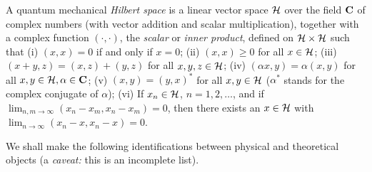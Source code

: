 \documentclass [11pt]{llncs}
\begin{document}
A quantum mechanical {\em Hilbert space} is a linear
vector space ${\cal H}$ over the field ${\bf C}$ of complex numbers
(with vector addition
and scalar multiplication), together  with a complex function
$(\cdot ,\cdot
)$, the {\em scalar} or {\em inner product}, defined on ${\cal
H}\times{\cal H}$ such that
(i)
$(x,x)=0$ if and only if $x=0$;
(ii)
$(x,x)\ge 0$ for all $x \in{\cal H}$;
(iii)
$(x+y,z)=(x,z)+(y,z)$ for all $x,y,z \in {\cal H}$;
(iv)
$(\alpha x,y)=\alpha (x,y)$ for all $x,y \in {\cal H}, \alpha \in {\bf C}$;
(v)
$(x,y)={(y,x)}^\ast $ for all $x,y \in {\cal H}$
(${\alpha }^\ast $ stands for the complex conjugate of $\alpha$);
(vi)
If $x_n\in {\cal H}$, $n=1,2,\ldots$, and if $\lim_{n,m\rightarrow
\infty} (x_n-x_m,x_n-x_m)=0$, then there exists an $x\in {\cal H}$ with
$\lim_{n\rightarrow \infty} (x_n-x,x_n-x)=0$.



We shall make the following identifications between physical and
theoretical
objects (a {\it caveat:} this is an incomplete list).
\end{document}
